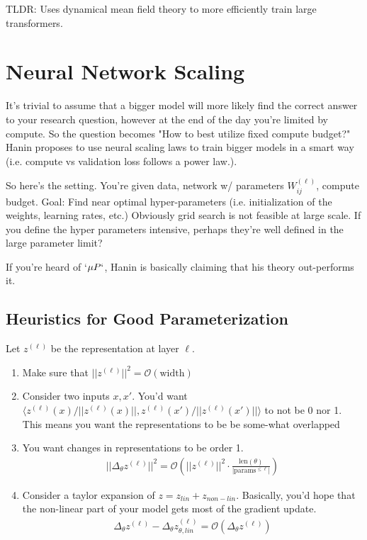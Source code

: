 TLDR: Uses dynamical mean field theory to more efficiently train large transformers.

\section{Neural Network Scaling}
It's trivial to assume that a bigger model will more likely find the correct answer to your research question, however at the end of the day you're limited by compute. So the question becomes "How to best utilize fixed compute budget?" Hanin proposes to use neural scaling laws to train bigger models in a smart way (i.e. compute vs validation loss follows a power law.).

So here's the setting. You're given data, network w/ parameters $W_{ij}^{(\ell)}$, compute budget. Goal: Find near optimal hyper-parameters (i.e. initialization of the weights, learning rates, etc.) Obviously grid search is not feasible at large scale. If you define the hyper parameters intensive, perhaps they're well defined in the large parameter limit?

If you're heard of `$\mu P`$, Hanin is basically claiming that his theory out-performs it.

\subsection{Heuristics for Good Parameterization}
Let $z^{(\ell)}$ be the representation at layer $\ell$. 
\begin{enumerate}
	\item Make sure that $||z^{(\ell)}||^2 = \mathcal O (\text{width})$
	\item Consider two inputs $x,x'$. You'd want $\langle z^{(\ell)}(x) / ||z^{(\ell)}(x)|| ,  z^{(\ell)}(x') / ||z^{(\ell)}(x')|| \rangle$ to not be 0 nor 1. This means you want the representations to be be some-what overlapped
	\item You want changes in representations to be order 1. 
	\begin{align}
		|| \Delta_{\theta}z^{(\ell)}||^2 = \mathcal O \left( ||z^{(\ell)}||^2 \cdot \frac{\text{len}(\theta)}{| \text{params}^{\leq \ell}|} \right)
	\end{align}
	\item Consider a taylor expansion of $z = z_{lin} + z_{non-lin}$. Basically, you'd hope that the non-linear part of your model gets most of the gradient update.
	\begin{align}
		\Delta_{\theta} z^{(\ell)} - \Delta_{\theta} z_{\theta, lin}^{(\ell)} = \mathcal O(\Delta_{\theta} z^{(\ell)})
	\end{align}
\end{enumerate}
